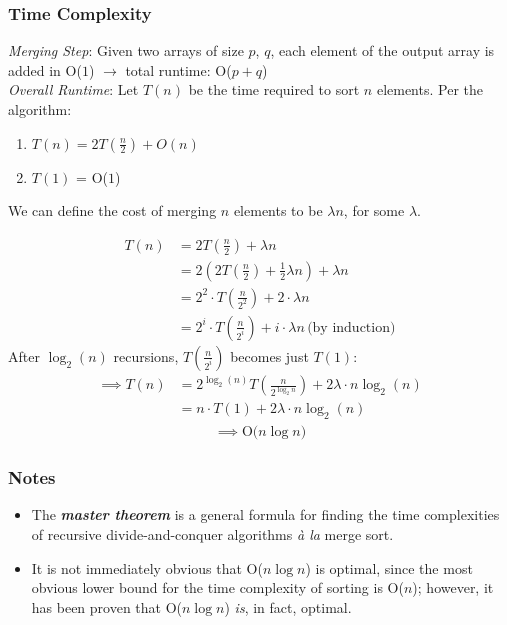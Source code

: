 \documentclass[12pt]{extarticle}
\theoremstyle{definition}
\theoremstyle{remark}
\begin{document}
\subsubsection*{Time Complexity}
\textit{Merging Step}: Given two arrays of size $p$, $q$, each element of the output array is added in O($1$) $\to$ total runtime: O($p+q$)\\

\noindent\textit{Overall Runtime}: Let $T(n)$ be the time required to sort $n$ elements. Per the algorithm: \begin{enumerate}
    \item $T(n)=2T(\frac{n}{2})+O(n)$
    \item $T(1)$ = O($1$)
\end{enumerate}
\begin{center}
    We can define the cost of merging $n$ elements to be $\lambda n$, for some $\lambda $.
\end{center}
\begin{align*}
    T(n)&=2T(\frac{n}{2})+\lambda n\\
    &=2(2T(\frac{n}{2})+\frac{1}{2}\lambda n)+\lambda n\\
    &=2^2\cdot T(\frac{n}{2^2})+2\cdot \lambda n\\
    &=2^i\cdot T(\frac{n}{2^i})+i\cdot \lambda n\,\text{(by induction)}
\end{align*}
After $\log_2(n)$ recursions, $T(\frac{n}{2^i})$ becomes just $T(1)$:
\begin{align*}
    \implies T(n)&=2^{\log_2(n)}T(\frac{n}{2^{\log_2n}})+2\lambda \cdot n\log_2(n)\\
    &=n\cdot T(1)+2\lambda \cdot n\log_2(n)
\end{align*}
\begin{gather*}
    \implies\text{O($n\log n$)}
\end{gather*}

\subsubsection*{Notes}
\begin{itemize}
    \item The \textbf{\textit{master theorem}} is a general formula for finding the time complexities of recursive divide-and-conquer algorithms \textit{\`{a} la} merge sort.
    \item It is not immediately obvious that O($n\log n$) is optimal, since the most obvious lower bound for the time complexity of sorting is O($n$); however, it has been proven that O($n\log n$) \textit{is}, in fact, optimal.
\end{itemize}
\end{document}
